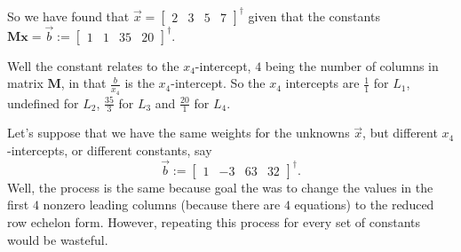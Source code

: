 \documentclass{article}
\begin{document}
So we have found that $\vec{x} = \left[\begin{matrix} 2 & 3 & 5 & 7 \end{matrix}\right]^\dagger$ given that the constants $\mathbf{M}\mathbf{x} = \vec{b} := \left[\begin{matrix} 1 & 1 & 35 & 20 \end{matrix}\right]^\dagger$.

Well the constant relates to the $x_4$-intercept, $4$ being the number of columns in matrix $\mathbf{M}$, in that $\frac{b}{x_4}$ is the $x_4$-intercept. So the $x_4$ intercepts are $\frac11$ for $L_1$, undefined for $L_2$, $\frac{35}3$ for $L_3$ and $\frac{20}1$ for $L_4$.

Let's suppose that we have the same weights for the unknowns $\vec{x}$, but different $x_4$-intercepts, or different constants, say
\begin{equation}\label{eq:new constants}
    \vec{b} := \left[\begin{matrix} 1 & -3 & 63 & 32 \end{matrix}\right]^\dagger.
\end{equation}
Well, the process is the same because goal the was to change the values in the first $4$ nonzero leading columns (because there are $4$ equations) to the reduced row echelon form.
However, repeating this process for every set of constants would be wasteful.

\end{document}
